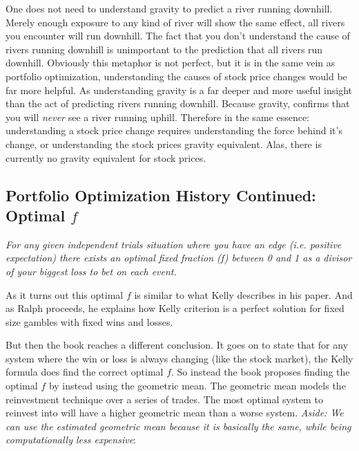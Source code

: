 \documentclass[11pt]{article}
\begin{document}
    One does not need to understand gravity to predict a river running downhill. Merely
    enough exposure to any kind of river will show the same effect, all rivers you
    encounter will run downhill. The fact that you don't understand the cause of rivers
    running downhill is unimportant to the prediction that all
    rivers run downhill. Obviously this metaphor is not perfect, but it is in the
    same vein as portfolio optimization, understanding the causes of stock price changes
    would be far more helpful. As understanding gravity is a far deeper and more useful
    insight than the act of predicting rivers running downhill. Because gravity, confirms
    that you will \textit{never} see a river running uphill. Therefore in the same
    essence: understanding a stock price change requires understanding the force behind
    it's change, or understanding the stock prices gravity equivalent. Alas, there is
    currently no gravity equivalent for stock prices.

\subsection{Portfolio Optimization History Continued: Optimal \(f\)}

    \begin{displayquote} \textit {
        For any given independent trials situation where you have an edge (i.e. positive 
        expectation) there exists an optimal fixed
        fraction (f) between 0 and 1 as a divisor of your biggest loss to bet on each event.
    } \end{displayquote}

    As it turns out this optimal \(f\) is similar to what Kelly describes in his paper. 
    And as Ralph proceeds, he explains how Kelly criterion is a perfect solution for 
    fixed size gambles with fixed wins and losses.

    But then the book reaches a different conclusion. It goes on to state that for any system where 
    the win or loss is always changing {(like the stock market)}, the Kelly formula does find
    the correct optimal \(f\).
    So instead the book proposes finding the optimal \(f\) by instead using the geometric
    mean. The geometric mean models the reinvestment technique over a series of trades.
    The most optimal system to reinvest into will have a higher geometric mean than a
    worse system. \emph{Aside: We can use the estimated geometric mean because it is
    basically the same, while being computationally less expensive}:
\end{document}
